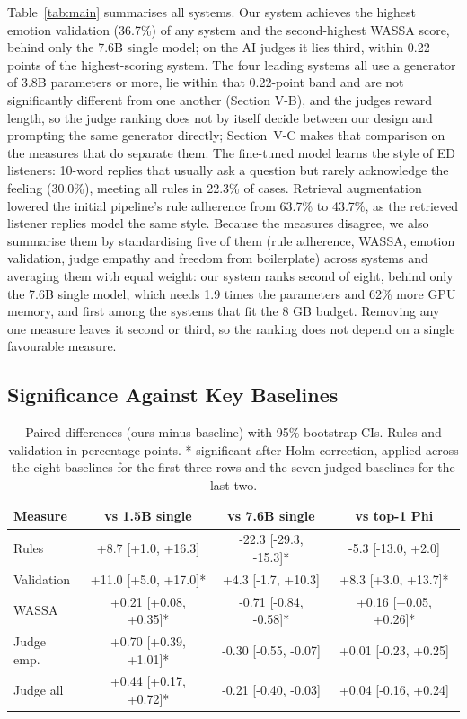 \documentclass[conference,a4paper]{IEEEtran}
\begin{document}
Table~\ref{tab:main} summarises all systems. Our system achieves the highest emotion validation (36.7\%) of any system and the second-highest WASSA score, behind only the 7.6B single model; on the AI judges it lies third, within 0.22 points of the highest-scoring system. The four leading systems all use a generator of 3.8B parameters or more, lie within that 0.22-point band and are not significantly different from one another (Section V-B), and the judges reward length, so the judge ranking does not by itself decide between our design and prompting the same generator directly; Section~V-C makes that comparison on the measures that do separate them. The fine-tuned model learns the style of ED listeners: 10-word replies that usually ask a question but rarely acknowledge the feeling (30.0\%), meeting all rules in 22.3\% of cases. Retrieval augmentation lowered the initial pipeline's rule adherence from 63.7\% to 43.7\%, as the retrieved listener replies model the same style. Because the measures disagree, we also summarise them by standardising five of them (rule adherence, WASSA, emotion validation, judge empathy and freedom from boilerplate) across systems and averaging them with equal weight: our system ranks second of eight, behind only the 7.6B single model, which needs 1.9 times the parameters and 62\% more GPU memory, and first among the systems that fit the 8 GB budget. Removing any one measure leaves it second or third, so the ranking does not depend on a single favourable measure.


\subsection{Significance Against Key Baselines}
\begin{table}[htbp]
\caption{Paired differences (ours minus baseline) with 95\% bootstrap CIs. Rules and validation in percentage points. * significant after Holm correction, applied across the eight baselines for the first three rows and the seven judged baselines for the last two.}
\label{tab:sig}
\begin{center}
\scriptsize
\begin{tabular}{|l|c|c|c|}
\hline
\textbf{Measure} & \textbf{vs 1.5B single} & \textbf{vs 7.6B single} & \textbf{vs top-1 Phi} \\
\hline
Rules & +8.7 [+1.0, +16.3] & -22.3 [-29.3, -15.3]* & -5.3 [-13.0, +2.0] \\
\hline
Validation & +11.0 [+5.0, +17.0]* & +4.3 [-1.7, +10.3] & +8.3 [+3.0, +13.7]* \\
\hline
WASSA & +0.21 [+0.08, +0.35]* & -0.71 [-0.84, -0.58]* & +0.16 [+0.05, +0.26]* \\
\hline
Judge emp. & +0.70 [+0.39, +1.01]* & -0.30 [-0.55, -0.07] & +0.01 [-0.23, +0.25] \\
\hline
Judge all & +0.44 [+0.17, +0.72]* & -0.21 [-0.40, -0.03] & +0.04 [-0.16, +0.24] \\
\hline
\end{tabular}
\end{center}
\end{table}
\end{document}
